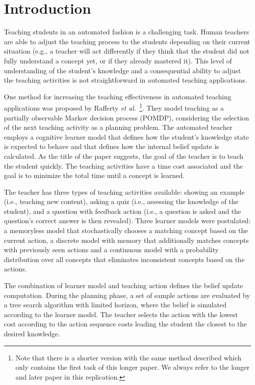 
\section{Introduction}

Teaching students in an automated fashion is a challenging task. 
Human teachers are able to adjust the teaching process to the students depending on their current situation (e.g., a teacher will act differently if they think that the student did not fully understand a concept yet, or if they already mastered it). This level of understanding of the student's knowledge and a consequential ability to adjust the teaching activities is not straightforward in automated teaching applications.

One method for increasing the teaching effectiveness in automated teaching applications was proposed by Rafferty \textit{et al.}~\cite{rafferty2016faster}\footnote{Note that there is a shorter version with the same method described which only contains the first task of this longer paper. We always refer to the longer and later paper in this replication.}. They model teaching as a partially observable Markov decision process (POMDP), considering the selection of the next teaching activity as a planning problem. The automated teacher employs a cognitive learner model that defines how the student's knowledge state is expected to behave and that defines how the internal belief update is calculated.
As the title of the paper suggests, the goal of the teacher is to teach the student quickly. The teaching activities have a time cost associated and the goal is to minimize the total time until a concept is learned. 

The teacher has three types of teaching activities available: showing an example (i.e., teaching new content), asking a quiz (i.e., assessing the knowledge of the student), and a question with feedback action (i.e., a question is asked and the question's correct answer is then revealed).
Three learner models were postulated: a memoryless model that stochastically chooses a matching concept based on the current action, a discrete model with memory that additionally matches concepts with previously seen actions and a continuous model with a probability distribution over all concepts that eliminates inconsistent concepts based on the actions.

The combination of learner model and teaching action defines the belief update computation. During the planning phase, a set of sample actions are evaluated by a tree search algorithm with limited horizon, where the belief is simulated according to the learner model. The teacher selects the action with the lowest cost according to the action sequence costs leading the student the closest to the desired knowledge.

